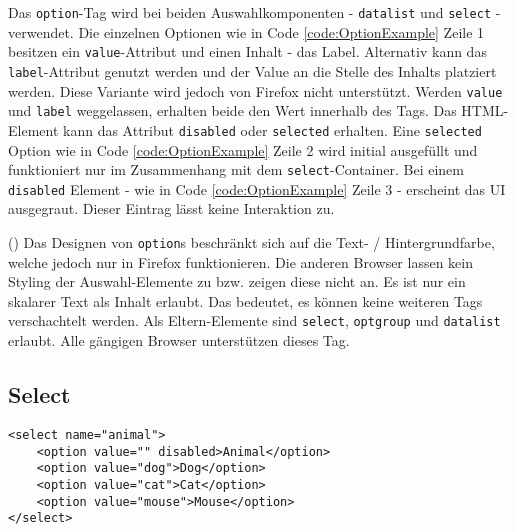 Das \texttt{option}-Tag wird bei beiden Auswahlkomponenten - \texttt{datalist} und \texttt{select} - verwendet. 
Die einzelnen Optionen wie in Code \ref{code:OptionExample} Zeile 1 besitzen ein \texttt{value}-Attribut und einen Inhalt - das Label.
Alternativ kann das \texttt{label}-Attribut genutzt werden und der Value an die Stelle des Inhalts platziert werden.
Diese Variante wird jedoch von Firefox nicht unterstützt.
Werden \texttt{value} und \texttt{label} weggelassen, erhalten beide den Wert innerhalb des Tags.
Das HTML-Element kann das Attribut \texttt{disabled} oder \texttt{selected} erhalten.
Eine \texttt{selected} Option wie in Code \ref{code:OptionExample} Zeile 2 wird initial ausgefüllt und funktioniert nur im Zusammenhang mit dem \texttt{select}-Container. 
Bei einem \texttt{disabled} Element - wie in Code \ref{code:OptionExample} Zeile 3 - erscheint das UI ausgegraut.
Dieser Eintrag lässt keine Interaktion zu.

(\cite{optionMdn}) Das Designen von \texttt{option}s beschränkt sich auf die Text- / Hintergrundfarbe, welche jedoch nur in Firefox funktionieren. 
Die anderen Browser lassen kein Styling der Auswahl-Elemente zu bzw. zeigen diese nicht an.
Es ist nur ein skalarer Text als Inhalt erlaubt. 
Das bedeutet, es können keine weiteren Tags verschachtelt werden.
Als Eltern-Elemente sind \texttt{select}, \texttt{optgroup} und \texttt{datalist} erlaubt.
Alle gängigen Browser unterstützen dieses Tag.



\subsection{Select}
\label{sec:select}

\begin{lstlisting}[style = htmlcssjs, caption = Select Example, label = code:SelectExample]
<select name="animal">
    <option value="" disabled>Animal</option>
    <option value="dog">Dog</option>
    <option value="cat">Cat</option>
    <option value="mouse">Mouse</option>
</select>
\end{lstlisting}

